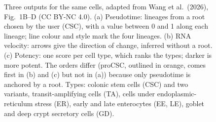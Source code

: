 \begin{figure}[ht]
  \caption{Three outputs for the same cells, adapted from Wang et al.\ (2026), Fig.~1B--D (CC BY-NC 4.0). (a)
    Pseudotime: lineages from a root chosen by the user (CSC), with a value between 0 and 1 along each lineage; line
    colour and style mark the four lineages. (b) RNA velocity: arrows give the direction of change, inferred without
    a root. (c) Potency: one score per cell type, which ranks the types; darker is more potent. The orders differ
    (proCSC, outlined in orange, comes first in (b) and (c) but not in (a)) because only pseudotime is anchored by a
    root. Types: colonic stem cells (CSC) and two variants, transit-amplifying cells (TA), cells under
    endoplasmic-reticulum stress (ER), early and late enterocytes (EE, LE), goblet and deep crypt secretory cells (GD).}
  \label{fig:dyn-paradigms}
\end{figure}

